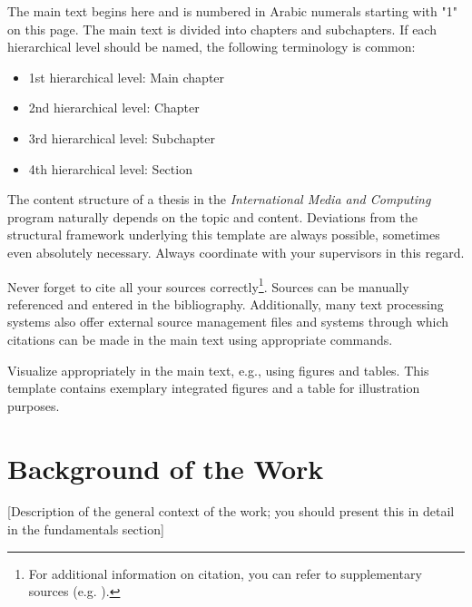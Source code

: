 \documentclass[oneside,bibliography=totocnumbered,BCOR=5mm]{scrbook}
\begin{document}

The main text begins here and is numbered in Arabic numerals starting with "1" on this page. The main text is divided into chapters and subchapters. If each hierarchical level should be named, the following terminology is common:

\begin{itemize}
\item 1st hierarchical level: Main chapter
\item 2nd hierarchical level: Chapter  
\item 3rd hierarchical level: Subchapter
\item 4th hierarchical level: Section
\end{itemize}

The content structure of a thesis in the \textit{International Media and Computing} program naturally depends on the topic and content. Deviations from the structural framework underlying this template are always possible, sometimes even absolutely necessary. Always coordinate with your supervisors in this regard.

Never forget to cite all your sources correctly\footnote{For additional information on citation, you can refer to supplementary sources (e.g. \cite{balzert2011}).}. Sources can be manually referenced and entered in the bibliography. Additionally, many text processing systems also offer external source management files and systems through which citations can be made in the main text using appropriate commands.

Visualize appropriately in the main text, e.g., using figures and tables. This template contains exemplary integrated figures and a table for illustration purposes.

\section{Background of the Work}
[Description of the general context of the work; you should present this in detail in the fundamentals section]
\end{document}
